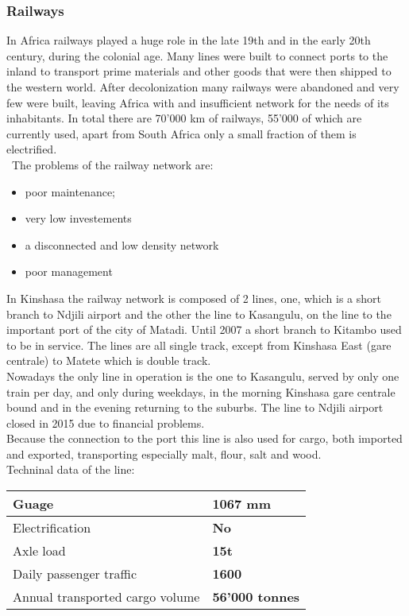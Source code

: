 \documentclass{article}
\begin{document}
\subsubsection{Railways}
In Africa railways played a huge role in the late 19th and in the early 20th century, during the colonial age. Many lines were built to connect ports to the inland to transport prime materials and other goods that were then shipped to the western world.  
After decolonization many railways were abandoned and very few were built, leaving Africa with and insufficient network for the needs of its inhabitants. 
In total there are 70’000 km of railways, 55’000 of which are currently used, apart from South Africa only a small fraction of them is electrified.\\
\
The problems of the railway network are: 
\begin{itemize}
\item{poor maintenance;}
\item{very low investements}
\item{a disconnected and low density network}
\item{poor management}
\end{itemize}
In Kinshasa the railway network is composed of 2 lines, one, which is a short branch to Ndjili airport and the other the line to Kasangulu, on the line to the important port of the city of Matadi. Until 2007 a short branch to Kitambo used to be in service. 
The lines are all single track, except from Kinshasa East (gare centrale) to Matete which is double track.\\
Nowadays the only line in operation is the one to Kasangulu, served by only one train per day, and only during weekdays, in the morning Kinshasa gare centrale bound and in the evening returning to the suburbs. The line to Ndjili airport closed in 2015 due to financial problems.\\
Because the connection to the port this line is also used for cargo, both imported and exported, transporting especially malt, flour, salt and wood.\\
Techninal data of the line:\\

\begin{tabularx}{1\textwidth} {
  | >{\centering\arraybackslash}X 
  | >{\centering\arraybackslash}X |}
 \hline
 Guage & \textbf{1067 mm} \\
 \hline
 Electrification & \textbf{No}\\
 \hline
 Axle load & \textbf{15t}\\
 \hline
 Daily passenger traffic & \textbf{1600}\\
 \hline
 Annual transported cargo volume & \textbf {56'000 tonnes}\\
 \hline
 \end{tabularx}
\end{document}
